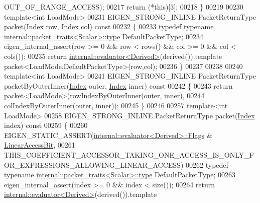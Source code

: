 \begin{DoxyCode}
      OUT\_OF\_RANGE\_ACCESS);
00217       \textcolor{keywordflow}{return} (*\textcolor{keyword}{this})[3];
00218     \}
00219 
00230     \textcolor{keyword}{template}<\textcolor{keywordtype}{int} LoadMode>
00231     EIGEN\_STRONG\_INLINE PacketReturnType packet(\hyperlink{group___core___module_a554f30542cc2316add4b1ea0a492ff02}{Index} row, \hyperlink{group___core___module_a554f30542cc2316add4b1ea0a492ff02}{Index} col)\textcolor{keyword}{ const}
00232 \textcolor{keyword}{    }\{
00233       \textcolor{keyword}{typedef} \textcolor{keyword}{typename} \hyperlink{group___sparse_core___module}{internal::packet\_traits<Scalar>::type} 
      DefaultPacketType;
00234       eigen\_internal\_assert(row >= 0 && row < rows() && col >= 0 && col < cols());
00235       \textcolor{keywordflow}{return} \hyperlink{struct_eigen_1_1internal_1_1evaluator}{internal::evaluator<Derived>}(derived()).\textcolor{keyword}{template} 
      packet<LoadMode,DefaultPacketType>(row,col);
00236     \}
00237 
00238 
00240     \textcolor{keyword}{template}<\textcolor{keywordtype}{int} LoadMode>
00241     EIGEN\_STRONG\_INLINE PacketReturnType packetByOuterInner(\hyperlink{group___core___module_a554f30542cc2316add4b1ea0a492ff02}{Index} outer, 
      \hyperlink{group___core___module_a554f30542cc2316add4b1ea0a492ff02}{Index} inner)\textcolor{keyword}{ const}
00242 \textcolor{keyword}{    }\{
00243       \textcolor{keywordflow}{return} packet<LoadMode>(rowIndexByOuterInner(outer, inner),
00244                               colIndexByOuterInner(outer, inner));
00245     \}
00246 
00257     \textcolor{keyword}{template}<\textcolor{keywordtype}{int} LoadMode>
00258     EIGEN\_STRONG\_INLINE PacketReturnType packet(\hyperlink{group___core___module_a554f30542cc2316add4b1ea0a492ff02}{Index} index)\textcolor{keyword}{ const}
00259 \textcolor{keyword}{    }\{
00260       EIGEN\_STATIC\_ASSERT(\hyperlink{struct_eigen_1_1internal_1_1evaluator}{internal::evaluator<Derived>::Flags} & 
      \hyperlink{group__flags_ga4b983a15d57cd55806df618ac544d09e}{LinearAccessBit},
00261                           
      THIS\_COEFFICIENT\_ACCESSOR\_TAKING\_ONE\_ACCESS\_IS\_ONLY\_FOR\_EXPRESSIONS\_ALLOWING\_LINEAR\_ACCESS)
00262       \textcolor{keyword}{typedef} \textcolor{keyword}{typename} \hyperlink{group___sparse_core___module}{internal::packet\_traits<Scalar>::type} 
      DefaultPacketType;
00263       eigen\_internal\_assert(index >= 0 && index < size());
00264       \textcolor{keywordflow}{return} \hyperlink{struct_eigen_1_1internal_1_1evaluator}{internal::evaluator<Derived>}(derived()).\textcolor{keyword}{template} 

\end{DoxyCode}
